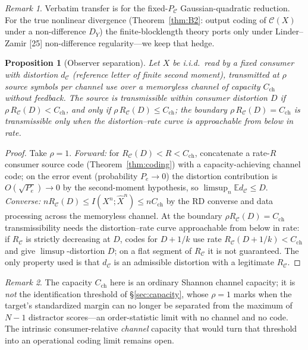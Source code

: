 \documentclass[lettersize,onecolumn]{IEEEtran}
\newtheorem{proposition}{Proposition}
\theoremstyle{definition}
\theoremstyle{remark}
\newtheorem*{remark}{Remark}
\newcommand{\PC}{P_{\mathcal{C}}}
\newcommand{\E}{\mathbb{E}}
\begin{document}
\begin{remark}
Verbatim transfer is for the fixed-$\PC$ Gaussian-quadratic reduction. For the true
nonlinear divergence (Theorem~\ref{thm:B2}: output coding of $\mathcal C(X)$ under a
non-difference $D_Y$) the finite-blocklength theory ports only under Linder--Zamir
[25] non-difference regularity---we keep that hedge.
\end{remark}

\begin{proposition}[Observer separation]\label{prop:separation}
Let $X$ be i.i.d.\ read by a fixed consumer with distortion $d_{\mathcal C}$ (reference
letter of finite second moment), transmitted at $\rho$ source symbols per channel use over
a memoryless channel of capacity $C_{\mathrm{ch}}$ without feedback. The source is
transmissible within consumer distortion $D$ if $\rho\,R_{\mathcal C}(D)<C_{\mathrm{ch}}$,
and only if $\rho\,R_{\mathcal C}(D)\le C_{\mathrm{ch}}$; the boundary
$\rho\,R_{\mathcal C}(D)=C_{\mathrm{ch}}$ is transmissible only when the distortion--rate
curve is approachable from below in rate.
\end{proposition}
\begin{proof}
Take $\rho=1$. \emph{Forward:} for $R_{\mathcal C}(D)<R<C_{\mathrm{ch}}$, concatenate a
rate-$R$ consumer source code (Theorem~\ref{thm:coding}) with a capacity-achieving channel
code; on the error event (probability $P_e\to0$) the distortion contribution is
$O(\sqrt{P_e})\to0$ by the second-moment hypothesis, so $\limsup_n\E d_{\mathcal C}\le D$.
\emph{Converse:} $nR_{\mathcal C}(D)\le I(X^n;\hat X^n)\le nC_{\mathrm{ch}}$ by the RD
converse and data processing across the memoryless channel. At the boundary $\rho
R_{\mathcal C}(D)=C_{\mathrm{ch}}$ transmissibility needs the distortion--rate curve
approachable from below in rate: if $R_{\mathcal C}$ is strictly decreasing at $D$, codes
for $D+1/k$ use rate $R_{\mathcal C}(D+1/k)<C_{\mathrm{ch}}$ and give $\limsup$-distortion
$D$; on a flat segment of $R_{\mathcal C}$ it is not guaranteed. The only property used is
that $d_{\mathcal C}$ is an admissible distortion with a legitimate $R_{\mathcal C}$.
\end{proof}

\begin{remark}
The capacity $C_{\mathrm{ch}}$ here is an ordinary Shannon channel capacity; it is
\emph{not} the identification threshold of \S\ref{sec:capacity}, whose $\rho=1$ marks when
the target's standardized margin can no longer be separated from the maximum of $N-1$
distractor scores---an order-statistic limit with no channel and no code. The intrinsic
consumer-relative \emph{channel} capacity that would turn that threshold into an
operational coding limit remains open.
\end{remark}
\end{document}
